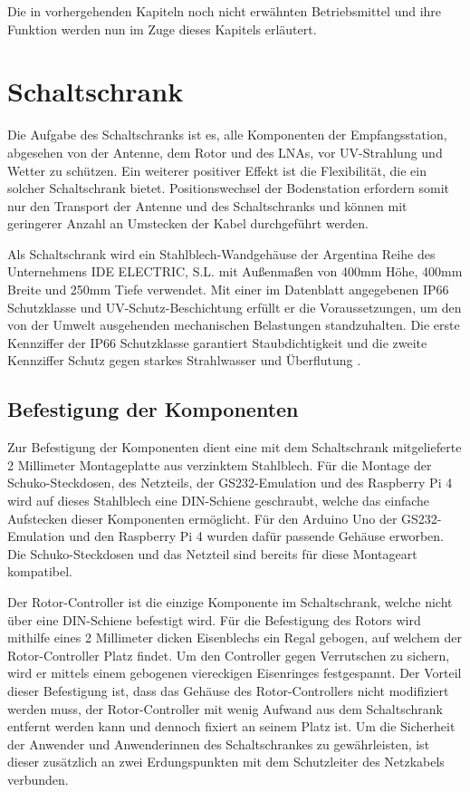 Die in vorhergehenden Kapiteln noch nicht erwähnten Betriebsmittel und ihre Funktion werden nun im Zuge dieses Kapitels erläutert. 

\section{Schaltschrank}
\label{sec:Schaltschrank}
Die Aufgabe des Schaltschranks ist es, alle Komponenten der Empfangsstation, abgesehen von der Antenne, dem Rotor und des LNAs, vor UV-Strahlung und Wetter zu schützen. Ein weiterer positiver Effekt ist die Flexibilität, die ein solcher Schaltschrank bietet. Positionswechsel der Bodenstation erfordern somit nur den Transport der Antenne und des Schaltschranks und können mit geringerer Anzahl an Umstecken der Kabel durchgeführt werden.

Als Schaltschrank wird ein Stahlblech-Wandgehäuse der Argentina Reihe des Unternehmens IDE ELECTRIC, S.L. mit Außenmaßen von 400mm Höhe, 400mm Breite und 250mm Tiefe verwendet. Mit einer im Datenblatt \cite{ide_electric_sl_datenblatt_nodate} angegebenen IP66 Schutzklasse und UV-Schutz-Beschichtung erfüllt er die Voraussetzungen, um den von der Umwelt ausgehenden mechanischen Belastungen standzuhalten. Die erste Kennziffer der IP66 Schutzklasse garantiert Staubdichtigkeit und die zweite Kennziffer Schutz gegen starkes Strahlwasser und Überflutung \cite{lienig_elektronische_2014}.

\subsection{Befestigung der Komponenten}
Zur Befestigung der Komponenten dient eine mit dem Schaltschrank mitgelieferte 2 Millimeter Montageplatte aus verzinktem Stahlblech. Für die Montage der Schuko-Steckdosen, des Netzteils, der GS232-Emulation und des Raspberry Pi 4 wird auf dieses Stahlblech eine DIN-Schiene geschraubt, welche das einfache Aufstecken dieser Komponenten ermöglicht. Für den Arduino Uno der GS232-Emulation und den Raspberry Pi 4 wurden dafür passende Gehäuse erworben. Die Schuko-Steckdosen und das Netzteil sind bereits für diese Montageart kompatibel. 

Der Rotor-Controller ist die einzige Komponente im Schaltschrank, welche nicht über eine DIN-Schiene befestigt wird. Für die Befestigung des Rotors wird mithilfe eines 2 Millimeter dicken Eisenblechs ein Regal gebogen, auf welchem der Rotor-Controller Platz findet. Um den Controller gegen Verrutschen zu sichern, wird er mittels einem gebogenen viereckigen Eisenringes festgespannt. Der Vorteil dieser Befestigung ist, dass das Gehäuse des Rotor-Controllers nicht modifiziert werden muss, der Rotor-Controller mit wenig Aufwand aus dem Schaltschrank entfernt werden kann und dennoch fixiert an seinem Platz ist. Um die Sicherheit der Anwender und Anwenderinnen des Schaltschrankes zu gewährleisten, ist dieser zusätzlich an zwei Erdungspunkten mit dem Schutzleiter des Netzkabels verbunden.

